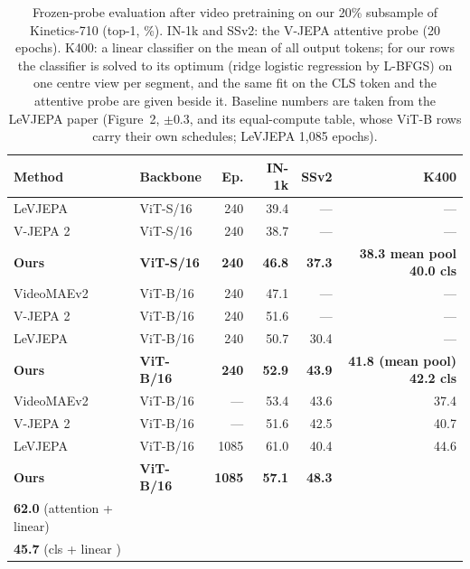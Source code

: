 \begin{table}[h]
\centering
\small
\begin{tabular}{llrrrr}
\toprule
Method & Backbone & Ep. & IN-1k & SSv2 & K400 \\
\midrule
LeVJEPA & ViT-S/16 & 240 & 39.4 & --- & --- \\
V-JEPA 2 & ViT-S/16 & 240 & 38.7 & --- & --- \\
\textbf{Ours} & \textbf{ViT-S/16} & \textbf{240}
& \textbf{46.8} & \textbf{37.3} & \textbf{38.3 mean pool} \textbf{40.0 cls}  \\
\midrule
VideoMAEv2 & ViT-B/16 & 240 & 47.1 & --- & --- \\
V-JEPA 2 & ViT-B/16 & 240 & 51.6 & --- & --- \\
LeVJEPA & ViT-B/16 & 240 & 50.7 & 30.4 & --- \\
\textbf{Ours} & \textbf{ViT-B/16} & \textbf{240} & \textbf{52.9} & \textbf{43.9} & \textbf{41.8 (mean pool)} \textbf{42.2 cls} \\
\midrule
VideoMAEv2 & ViT-B/16 & --- & 53.4 & 43.6 & 37.4 \\
V-JEPA 2 & ViT-B/16 & --- & 51.6 & 42.5 & 40.7 \\
LeVJEPA & ViT-B/16 & 1085 & 61.0 & 40.4 & 44.6 \\
\midrule
\textbf{Ours} & \textbf{ViT-B/16} & \textbf{1085} & \textbf{57.1} &
\textbf{48.3} &
\makecell[l]{\textbf{43.4} (mean pooling + linear)\\
             \textbf{62.0} (attention + linear)\\
             \textbf{45.7} (cls + linear )}
\\
\bottomrule
\end{tabular}

\caption{Frozen-probe evaluation after video pretraining on our 20\% subsample of Kinetics-710 (top-1, \%). IN-1k and SSv2: the V-JEPA attentive probe (20 epochs). K400: a linear classifier on the mean of all output tokens; for our rows the classifier is solved to its optimum (ridge logistic regression by L-BFGS) on one centre view per segment, and the same fit on the CLS token and the attentive probe are given beside it. Baseline numbers are taken from the LeVJEPA paper (Figure~2, $\pm0.3$, and its equal-compute table, whose ViT-B rows carry their own schedules; LeVJEPA 1{,}085 epochs).}
\label{tab:video-main}
\end{table}

